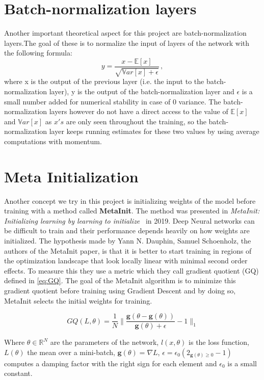 \documentclass[a4paper,11pt,oneside]{report}
\begin{document}
\section{Batch-normalization layers}
Another important theoretical aspect for this project are batch-normalization layers.The goal of these is to normalize the input of layers of the network with the following formula:
\begin{equation}\label{eq:BN}
    y = \frac{x-\mathbb{E}[x]}{\sqrt{\mathbb{V}ar[x]+\epsilon}}\,,
\end{equation}
where x is the output of the previous layer (i.e. the input to the batch-normalization layer), y is the output of the batch-normalization layer and $\epsilon$ is a small number added for numerical stability in case of 0 variance. The batch-normalization layers however do not have a direct access to the value of $\mathbb{E}[x]$ and $\mathbb{V}ar[x]$ as $x's$ are only seen throughout the training, so the batch-normalization layer keeps running estimates for these two values by using average computations with momentum. 

\section{Meta Initialization}
Another concept we try in this project is initializing weights of the model before training with a method called \textbf{MetaInit}. The method was presented in \textit{MetaInit: Initializing learning by learning to initialize}~\citep{NEURIPS2019_876e8108} in 2019. Deep Neural networks can be difficult to train and their performance depends heavily on how weights are initialized. The hypothesis made by Yann N. Dauphin, Samuel Schoenholz, the authors of the MetaInit paper, is that it is better to start training in regions of the optimization landscape that look locally linear with minimal second order effects. To measure this they use a metric which they call gradient quotient (GQ) defined in \autoref{eq:GQ}. The goal of the MetaInit algorithm is to minimize this gradient quotient before training using Gradient Descent and by doing so, MetaInit selects the initial weights for training.

\begin{equation}\label{eq:GQ}
    GQ(L,\theta) = \frac{1}{N}\biggl\lVert\frac{\textbf{g}(\theta-\textbf{g}(\theta))}{\textbf{g}(\theta)+\epsilon}-1 \biggr\rVert_1
\end{equation}

Where $\theta \in \mathbb{R}^N$ are the parameters of the network, $l(x, \theta)$ is the loss function, $L(\theta)$ the mean over a mini-batch, $\textbf{g}(\theta) = \nabla L$, $\epsilon = \epsilon_0(2_{\textbf{g}(\theta)\geq 0}-1)$ computes a damping factor with the right sign for each element and $\epsilon_0$ is a small constant.
\end{document}
